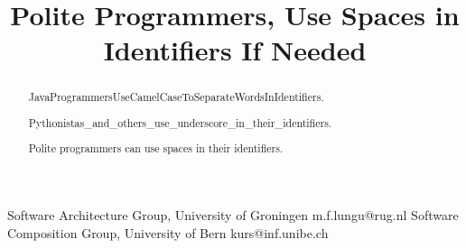 \documentclass[preprint]{sigplanconf}
\begin{document}
\setlength{\pdfpageheight}{\paperheight}
\setlength{\pdfpagewidth}{\paperwidth}




\title{Polite Programmers, Use Spaces in Identifiers If Needed}





           {Software Architecture Group,
           University of Groningen}
           {m.f.lungu@rug.nl}
           {Software Composition Group,
           University of Bern}
           {kurs@inf.unibe.ch}

\maketitle

\begin{abstract}

\noindent
JavaProgrammersUseCamelCaseToSeparateWordsInIdentifiers. 
\vspace{0.1em}

\noindent
Pythonistas\_and\_others\_use\_underscore\_in\_their\_identifiers. 
\vspace{0.1em}

\noindent
Polite programmers can use spaces in their identifiers.
\end{abstract}
\end{document}
